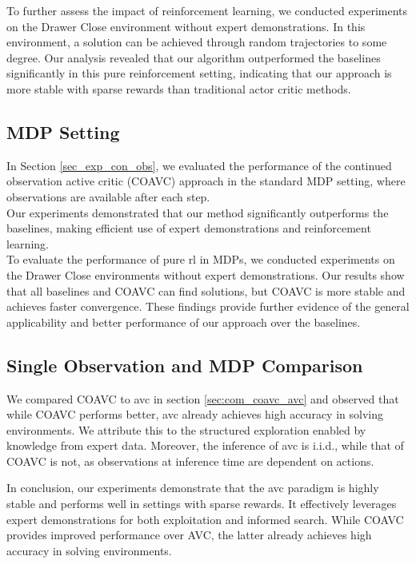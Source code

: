 To further assess the impact of reinforcement learning, we conducted experiments on the Drawer Close environment without expert demonstrations. 
In this environment, a solution can be achieved through random trajectories to some degree. 
Our analysis revealed that our algorithm outperformed the baselines significantly in this pure reinforcement setting, 
indicating that our approach is more stable with sparse rewards than traditional actor critic methods.\\




\subsection{MDP Setting}
In Section \ref{sec_exp_con_obs}, we evaluated the performance of the continued observation active critic (COAVC) approach in the standard MDP setting, 
where observations are available after each step.\\

Our experiments demonstrated that our method significantly outperforms the baselines, making efficient use of expert demonstrations and reinforcement learning.\\

To evaluate the performance of pure \ac{rl} in MDPs, we conducted experiments on the Drawer Close 
environments without expert demonstrations. Our results show that all baselines and COAVC can find solutions, but COAVC is more stable and achieves 
faster convergence. These findings provide further evidence of the general applicability and better performance of our approach over the baselines. 

\subsection{Single Observation and MDP Comparison}
We compared COAVC to \ac{avc} in section \ref{sec:com_coavc_avc} and observed that while COAVC performs better, 
\ac{avc} already achieves high accuracy in solving environments. We attribute this to the structured exploration enabled by knowledge from 
expert data. Moreover, the inference of \ac{avc} is i.i.d., while that of COAVC is not, as observations at inference time are dependent on actions. 

In conclusion, our experiments demonstrate that the \ac{avc} paradigm is highly stable and performs well in settings with sparse rewards. 
It effectively leverages expert demonstrations for both exploitation and informed search. While COAVC provides improved performance over 
AVC, the latter already achieves high accuracy in solving environments.

